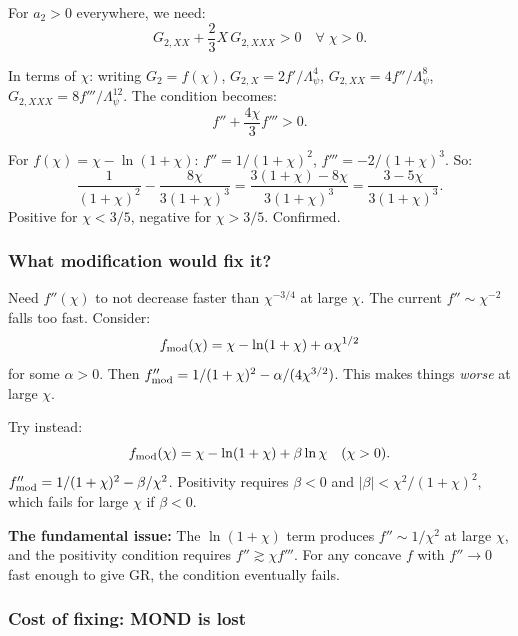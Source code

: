 \documentclass[11pt,a4paper]{article}
\begin{document}
For $a_2 > 0$ everywhere, we need:
\begin{equation}
G_{2,XX} + \frac{2}{3}X\,G_{2,XXX} > 0 \quad \forall\;\chi > 0.
\end{equation}

In terms of $\chi$: writing $G_2 = f(\chi)$, $G_{2,X} = 2f'/\Lambda_\psi^4$, $G_{2,XX} = 4f''/\Lambda_\psi^8$, $G_{2,XXX} = 8f'''/\Lambda_\psi^{12}$. The condition becomes:
\begin{equation}
f'' + \frac{4\chi}{3}f''' > 0.
\end{equation}

For $f(\chi) = \chi - \ln(1+\chi)$: $f'' = 1/(1+\chi)^2$, $f''' = -2/(1+\chi)^3$. So:
\begin{equation}
\frac{1}{(1+\chi)^2} - \frac{8\chi}{3(1+\chi)^3} = \frac{3(1+\chi) - 8\chi}{3(1+\chi)^3} = \frac{3 - 5\chi}{3(1+\chi)^3}.
\end{equation}
Positive for $\chi < 3/5$, negative for $\chi > 3/5$. Confirmed.

\subsubsection{What modification would fix it?}

Need $f''(\chi)$ to not decrease faster than $\chi^{-3/4}$ at large $\chi$. The current $f'' \sim \chi^{-2}$ falls too fast. Consider:
\begin{equation}
f_{\rm mod}(\chi) = \chi - \ln(1+\chi) + \alpha\chi^{1/2}
\end{equation}
for some $\alpha > 0$. Then $f''_{\rm mod} = 1/(1+\chi)^2 - \alpha/(4\chi^{3/2})$. This makes things \emph{worse} at large $\chi$.

Try instead:
\begin{equation}
f_{\rm mod}(\chi) = \chi - \ln(1+\chi) + \beta\ln\chi \quad (\chi > 0).
\end{equation}
$f''_{\rm mod} = 1/(1+\chi)^2 - \beta/\chi^2$. Positivity requires $\beta < 0$ and $|\beta| < \chi^2/(1+\chi)^2$, which fails for large $\chi$ if $\beta < 0$.

\textbf{The fundamental issue:} The $\ln(1+\chi)$ term produces $f'' \sim 1/\chi^2$ at large $\chi$, and the positivity condition requires $f'' \gtrsim \chi f'''$. For any concave $f$ with $f'' \to 0$ fast enough to give GR, the condition eventually fails.

\subsubsection{Cost of fixing: MOND is lost}
\end{document}
